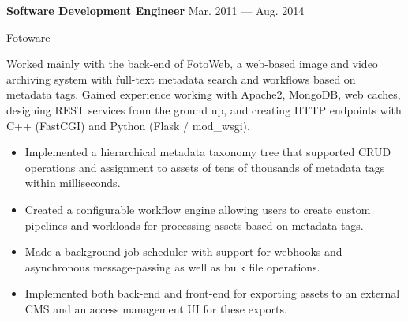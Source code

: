 \parbox[t][][t]{\linewidth}{
	\parbox{\linewidth}{{\textbf{Software Development Engineer}}
		\hfill {{Mar. 2011 --- Aug. 2014}}}
		\smallbreak

	\parbox{\linewidth}{Fotoware}

	\bigskip
	Worked mainly with the back-end of FotoWeb, a web-based image and video
	archiving system with full-text metadata search and workflows based on
	metadata tags. Gained experience working with Apache2, MongoDB, web
	caches, designing REST services from the ground up, and creating HTTP endpoints with C++ (FastCGI)
	and Python (Flask / mod\_wsgi).

	\bigskip
	\begin{itemize}
		\item{Implemented a hierarchical metadata taxonomy tree that
			supported CRUD operations and assignment to assets of tens of thousands of metadata tags within
			milliseconds.}\\[-.6em]
		\item{Created a configurable workflow engine allowing users to
			create custom pipelines and workloads for processing assets based on
			metadata tags.}\\[-.6em]
		\item{Made a background job scheduler with support for
			webhooks and asynchronous message-passing as well as
			bulk file operations.}\\[-.6em]
		\item{Implemented both back-end and front-end for exporting
			assets to an external CMS and an access 
			management UI for these exports.}\\[-.6em]
	\end{itemize}
}
